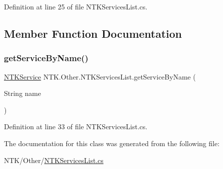 Definition at line 25 of file N\+T\+K\+Services\+List.\+cs.



\subsection{Member Function Documentation}
\mbox{\label{class_n_t_k_1_1_other_1_1_n_t_k_services_list_a784f569e07c154a71c7d4b4e55dcfda8}} 
\subsubsection{\texorpdfstring{getServiceByName()}{getServiceByName()}}
{\footnotesize\ttfamily \mbox{\hyperlink{class_n_t_k_1_1_service_1_1_n_t_k_service}{N\+T\+K\+Service}} N\+T\+K.\+Other.\+N\+T\+K\+Services\+List.\+get\+Service\+By\+Name (\begin{DoxyParamCaption}\item[{String}]{name }\end{DoxyParamCaption})}



Definition at line 33 of file N\+T\+K\+Services\+List.\+cs.



The documentation for this class was generated from the following file\+:\begin{DoxyCompactItemize}
\item 
N\+T\+K/\+Other/\mbox{\hyperlink{_n_t_k_services_list_8cs}{N\+T\+K\+Services\+List.\+cs}}\end{DoxyCompactItemize}
